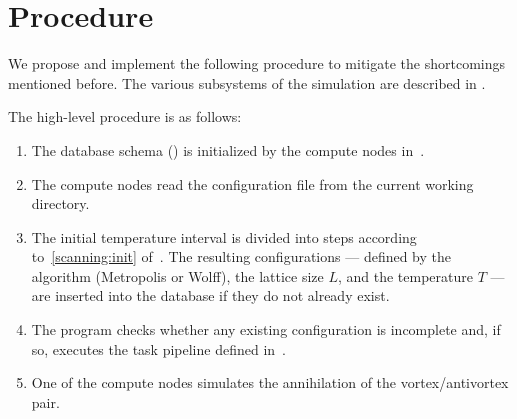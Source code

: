 \section{Procedure}
	We propose and implement the following procedure to mitigate the shortcomings mentioned before. The various subsystems of the simulation are described in .
	
	The high-level procedure is as follows:
	\begin{enumerate}
		\item The database schema () is initialized by the compute nodes in~.
		\item The compute nodes read the configuration file from the current working directory.
		\item The initial temperature interval is divided into steps according to~\cref{scanning:init} of~. The resulting configurations --- defined by the algorithm (Metropolis or Wolff), the lattice size $L$, and the temperature $T$ --- are inserted into the database if they do not already exist.
		\item The program checks whether any existing configuration is incomplete and, if so, executes the task pipeline defined in~.
		\item One of the compute nodes simulates the annihilation of the vortex/antivortex pair.
	\end{enumerate}


